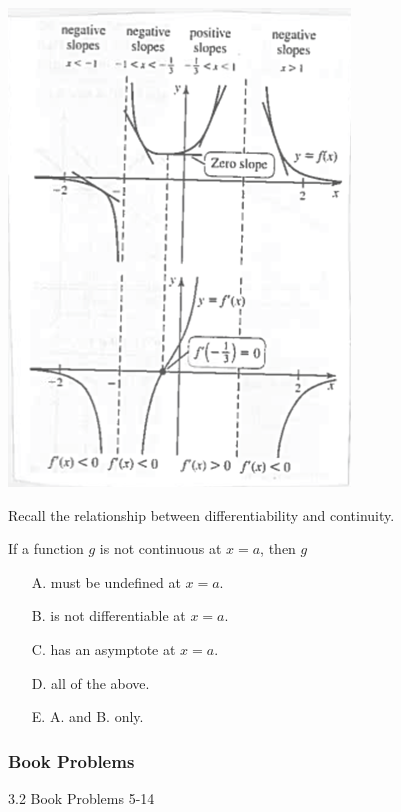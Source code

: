 \documentclass[cal1spr16Lectures.tex]{subfiles}
\begin{document}
\begin{frame}
\begin{center}
\includegraphics[scale=1]{pictures/Ch3Sect2new4}
\end{center}
\end{frame}

\begin{frame}
Recall the relationship between differentiability and continuity.
\begin{exe}
If a function $g$ is not continuous at $x=a$, then $g$
\begin{itemize}
\item[A. ] must be undefined at $x=a$.
\item[B. ] is not differentiable at $x=a$.
\item[C. ] has an asymptote at $x=a$.
\item[D. ] all of the above.
\item[E. ] A. and B. only.
\end{itemize}
\end{exe}
\end{frame}

\subsubsection{Book Problems}

\begin{frame}{}
\begin{block}{3.2 Book Problems} 5-14 \end{block} 
\end{frame}
\end{document}
